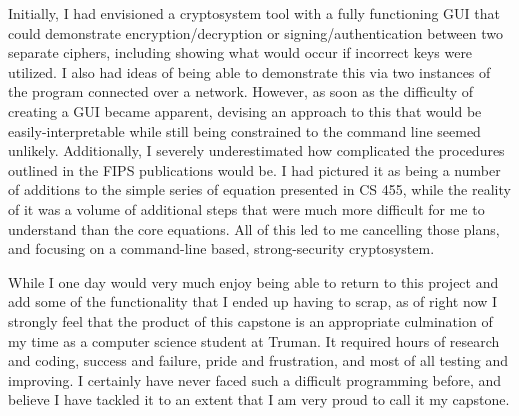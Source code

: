 \documentclass[11pt]{article}
\begin{document}
Initially, I had envisioned a cryptosystem tool with a fully functioning GUI that could demonstrate encryption/decryption or signing/authentication between two separate ciphers, including showing what would occur if incorrect keys were utilized. I also had ideas of being able to demonstrate this via two instances of the program connected over a network. However, as soon as the difficulty of creating a GUI became apparent, devising an approach to this that would be easily-interpretable while still being constrained to the command line seemed unlikely. Additionally, I severely underestimated how complicated the procedures outlined in the FIPS publications would be. I had pictured it as being a number of additions to the simple series of equation presented in CS 455, while the reality of it was a volume of additional steps that were much more difficult for me to understand than the core equations. All of this led to me cancelling those plans, and focusing on a command-line based, strong-security cryptosystem.

While I one day would very much enjoy being able to return to this project and add some of the functionality that I ended up having to scrap, as of right now I strongly feel that the product of this capstone is an appropriate culmination of my time as a computer science student at Truman. It required hours of research and coding, success and failure, pride and frustration, and most of all testing and improving. I certainly have never faced such a difficult programming before, and believe I have tackled it to an extent that I am very proud to call it my capstone.
\end{document}
